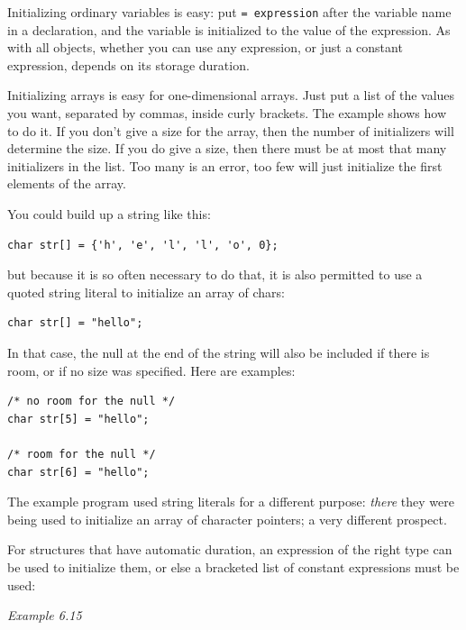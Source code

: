    Initializing ordinary variables is easy: put \texttt{= expression}
    after the variable name in a declaration, and the variable is initialized
    to the value of the expression. As with all objects, whether you can use
    any expression, or just a constant expression, depends on its storage
    duration.


   Initializing arrays is easy for one-dimensional arrays. Just put a list
    of the values you want, separated by commas, inside curly brackets. The
    example shows how to do it. If you don't give a size for the array, then
    the number of initializers will determine the size. If you do give a size,
    then there must be at most that many initializers in the list. Too many is
    an error, too few will just initialize the first elements of the array.


   You could build up a string like this:


   \begin{Verbatim}
char str[] = {'h', 'e', 'l', 'l', 'o', 0};
\end{Verbatim}

   but because it is so often necessary to do that, it is also permitted to
    use a quoted string literal to initialize an array of chars:


   \begin{Verbatim}
char str[] = "hello";
\end{Verbatim}

   In that case, the null at the end of the string will also be included if
    there is room, or if no size was specified. Here are examples:


   \begin{Verbatim}
/* no room for the null */
char str[5] = "hello";

/* room for the null */
char str[6] = "hello";
\end{Verbatim}

   The example program used string literals for a different purpose:
    \textit{there} they were being used to initialize an array of character
    pointers; a very different prospect.


   For structures that have automatic duration, an expression of the right
    type can be used to initialize them, or else a bracketed list of constant
    expressions must be used:


    \begin{center}\textit{Example 6.15}\end{center}


